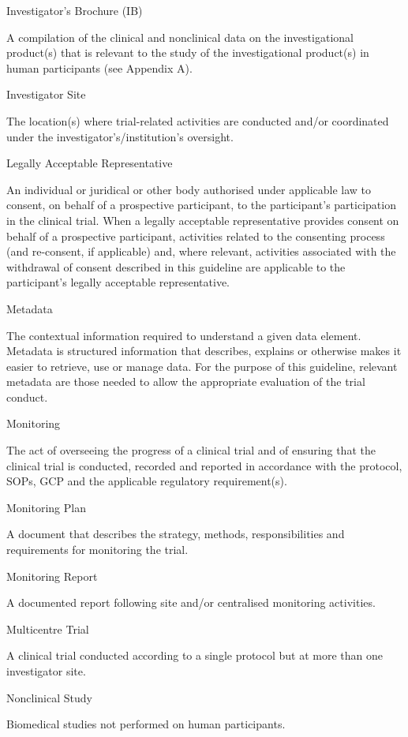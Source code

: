 \documentclass[11pt]{article}
\begin{document}
Investigator's Brochure (IB)


A compilation of the clinical and nonclinical data on the investigational product(s) that is relevant to the study of the investigational product(s) in human participants (see Appendix A).


Investigator Site


The location(s) where trial-related activities are conducted and/or coordinated under the investigator's/institution's oversight.


Legally Acceptable Representative


An individual or juridical or other body authorised under applicable law to consent, on behalf of a prospective participant, to the participant's participation in the clinical trial. When a legally acceptable representative provides consent on behalf of a prospective participant, activities related to the consenting process (and re-consent, if applicable) and, where relevant, activities associated with the withdrawal of consent described in this guideline are applicable to the participant's legally acceptable representative.


Metadata


The contextual information required to understand a given data element. Metadata is structured information that describes, explains or otherwise makes it easier to retrieve, use or manage data. For the purpose of this guideline, relevant metadata are those needed to allow the appropriate evaluation of the trial conduct.


Monitoring


The act of overseeing the progress of a clinical trial and of ensuring that the clinical trial is conducted, recorded and reported in accordance with the protocol, SOPs, GCP and the applicable regulatory requirement(s).


Monitoring Plan


A document that describes the strategy, methods, responsibilities and requirements for monitoring the trial.


Monitoring Report


A documented report following site and/or centralised monitoring activities.


Multicentre Trial


A clinical trial conducted according to a single protocol but at more than one investigator site.


Nonclinical Study


Biomedical studies not performed on human participants.
\end{document}
